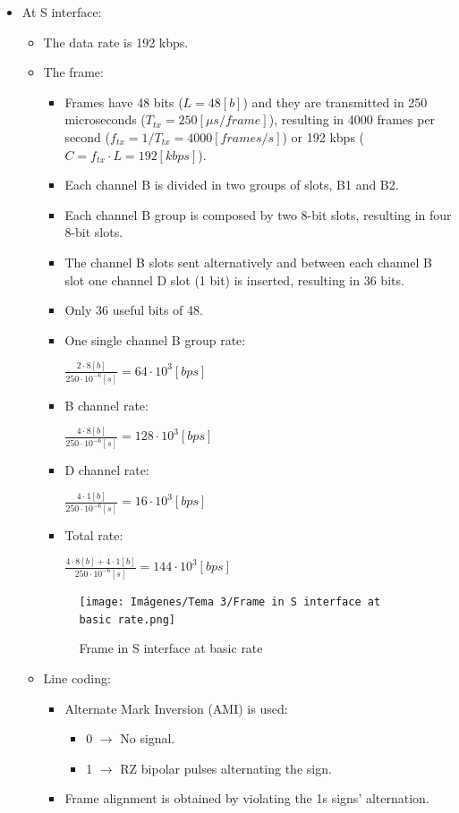\documentclass[
	12pt,
	twoside
]{book}
\begin{document}
\begin{itemize}
	\item {
		At S interface:
		\begin{itemize}
			\item The data rate is 192 kbps.
			\item {
				The frame:
				\begin{itemize}
					\item Frames have 48 bits ($L = 48 [b] $) and they are transmitted in 250 microseconds ($T_{tx} = 250 [\mu s/frame]$), resulting in 4000 frames per second ($f_{tx} = 1/T_{tx} = 4000 [frames/s]$) or 192 kbps ($C = f_{tx} \cdot L = 192 [kbps]$).
					\item Each channel B is divided in two groups of slots, B1 and B2.
					\item Each channel B group is composed by two 8-bit slots, resulting in four 8-bit slots.
					\item The channel B slots sent alternatively and between each channel B slot one channel D slot (1 bit) is inserted, resulting in 36 bits.
					\item Only 36 useful bits of 48.
					\item {
						One single channel B group rate:

						$
							\frac {2 \cdot 8 [b]} {250 \cdot 10^{-6} [s]} = 64 \cdot 10^3 [bps]
						$
					}
					\item {
						B channel rate:

						$
							\frac {4 \cdot 8 [b]} {250 \cdot 10^{-6} [s]} = 128 \cdot 10^3 [bps]
						$
					}
					\item {
						D channel rate:

						$
							\frac {4 \cdot 1 [b]} {250 \cdot 10^{-6} [s]} = 16 \cdot 10^3 [bps]
						$
					}
					\item {
						Total rate:

						$
							\frac {4 \cdot 8 [b] + 4 \cdot 1 [b]} {250 \cdot 10^{-6} [s]} = 144 \cdot 10^3 [bps]
						$
					}
				\end{itemize}

				\begin{figure}[H]
					\centering
					\texttt{[image: Imágenes/Tema 3/Frame in S interface at basic rate.png]}
					\caption{
						\label{fig:unit3_frame_S_basic}
						Frame in S interface at basic rate
					}
				\end{figure}
			}
			\item {
				Line coding:
				\begin{itemize}
					\item {
						Alternate Mark Inversion (AMI) is used:
						\begin{itemize}
							\item 0 $\rightarrow$ No signal.
							\item 1 $\rightarrow$ RZ bipolar pulses alternating the sign.
						\end{itemize}
					}
					\item {
						Frame alignment is obtained by violating the 1s signs' alternation.

}
\end{itemize}}
\end{itemize}}
\end{itemize}
\end{document}
